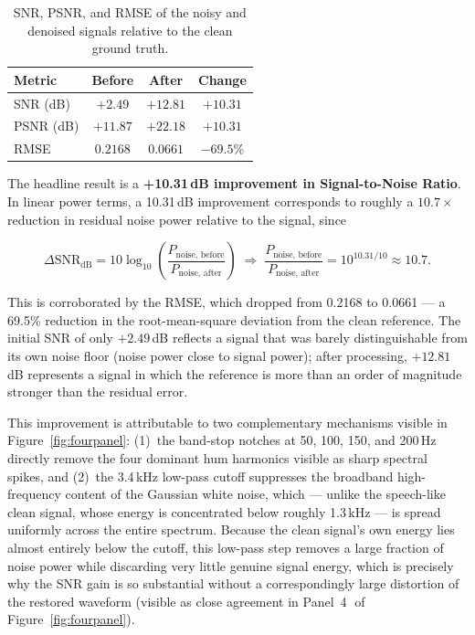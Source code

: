 \documentclass[11pt]{article}
\begin{document}
\begin{table}[h!]
\centering
\begin{tabular}{@{}lccc@{}}
\toprule
\textbf{Metric} & \textbf{Before} & \textbf{After} & \textbf{Change} \\
\midrule
SNR (dB)   & $+2.49$   & $+12.81$  & $+10.31$ \\
PSNR (dB)  & $+11.87$  & $+22.18$  & $+10.31$ \\
RMSE       & $0.2168$  & $0.0661$  & $-69.5\%$ \\
\bottomrule
\end{tabular}
\caption{SNR, PSNR, and RMSE of the noisy and denoised signals relative to
the clean ground truth.}
\label{tab:metrics}
\end{table}

The headline result is a \textbf{+10.31\,dB improvement in Signal-to-Noise
Ratio}. In linear power terms, a 10.31\,dB improvement corresponds to
roughly a $10.7\times$ reduction in residual noise power relative to the
signal, since

\begin{equation}
\Delta\text{SNR}_{\text{dB}} = 10 \log_{10}\!\left(\frac{P_{\text{noise, before}}}{P_{\text{noise, after}}}\right)
\;\Rightarrow\;
\frac{P_{\text{noise, before}}}{P_{\text{noise, after}}} = 10^{10.31/10} \approx 10.7.
\end{equation}

This is corroborated by the RMSE, which dropped from 0.2168 to 0.0661 ---
a 69.5\% reduction in the root-mean-square deviation from the clean
reference. The initial SNR of only $+2.49$\,dB reflects a signal that was
barely distinguishable from its own noise floor (noise power close to
signal power); after processing, $+12.81$\,dB represents a signal in which
the reference is more than an order of magnitude stronger than the
residual error.

This improvement is attributable to two complementary mechanisms visible
in Figure~\ref{fig:fourpanel}: (1)~the band-stop notches at 50, 100, 150,
and 200\,Hz directly remove the four dominant hum harmonics visible as
sharp spectral spikes, and (2)~the 3.4\,kHz low-pass cutoff suppresses the
broadband high-frequency content of the Gaussian white noise, which
--- unlike the speech-like clean signal, whose energy is concentrated
below roughly 1.3\,kHz --- is spread uniformly across the entire spectrum.
Because the clean signal's own energy lies almost entirely below the
cutoff, this low-pass step removes a large fraction of noise power while
discarding very little genuine signal energy, which is precisely why the
SNR gain is so substantial without a correspondingly large distortion of
the restored waveform (visible as close agreement in Panel~\textcircled{4}
of Figure~\ref{fig:fourpanel}).
\end{document}
